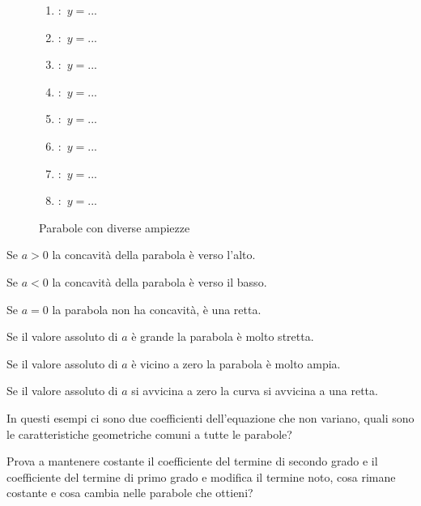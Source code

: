 \newpage %

\begin{figure}[h]
\begin{minipage}{.65\textwidth}
 \begin{inaccessibleblock}
 \scalebox{.9}{\coefficientea}
  \caption{Parabole con diverse ampiezze} \label{fig:parabola_coeff_a}
\end{inaccessibleblock}
\end{minipage}
\hfill
\begin{minipage}{.33\textwidth}
 \begin{enumerate}[label=\alph*]
   \item :~\(y=...\)
   \item :~\(y=...\)
   \item :~\(y=...\)
   \item :~\(y=...\)
   \item :~\(y=...\)
   \item :~\(y=...\)
   \item :~\(y=...\)
   \item :~\(y=...\)
 \end{enumerate}
\end{minipage}
\end{figure}

\begin{enumerate*}
 \item Se \(a>0\) la concavità della parabola è verso l'alto.
 \item Se \(a<0\) la concavità della parabola è verso il basso.
 \item Se \(a=0\) la parabola non ha concavità, è una retta.
 \item Se il valore assoluto di \(a\) è grande la parabola è molto stretta.
 \item Se il valore assoluto di \(a\) è vicino a zero la parabola è molto ampia.
 \item Se il valore assoluto di \(a\) si avvicina a zero la curva si avvicina a 
  una retta.
\end{enumerate*}

In questi esempi ci sono due coefficienti dell'equazione che non variano, 
quali sono le caratteristiche geometriche comuni a tutte le parabole?

Prova a mantenere costante il coefficiente del termine di secondo grado e 
il coefficiente del termine di primo grado e modifica
il termine noto, 
cosa rimane costante e cosa cambia nelle parabole che ottieni?

